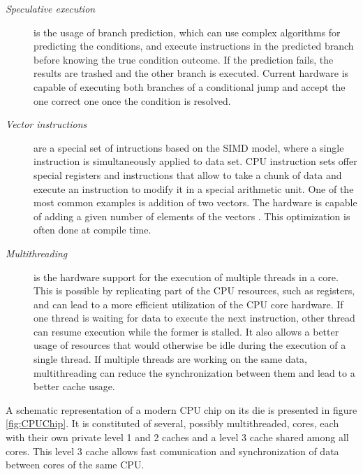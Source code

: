 \begin{description}
\begin{description}
	\end{description}
	\item[\textit{Speculative execution}] is the usage of branch prediction, which can use complex algorithms for predicting the conditions, and execute instructions in the predicted branch before knowing the true condition outcome. If the prediction fails, the results are trashed and the other branch is executed. Current hardware is capable of executing both branches of a conditional jump and accept the one correct one once the condition is resolved.
	\item[\textit{Vector instructions}] are a special set of intructions based on the SIMD model, where a single instruction is simultaneously applied to data set. CPU instruction sets offer special registers and instructions that allow to take a chunk of data and execute an instruction to modify it in a special arithmetic unit. One of the most common examples is addition of two vectors. The hardware is capable of adding a given number of elements of the vectors . This optimization is often done at compile time.
	\item[\textit{Multithreading}] is the hardware support for the execution of multiple threads in a core. This is possible by replicating part of the CPU resources, such as registers, and can lead to a more efficient utilization of the CPU core hardware. If one thread is waiting for data to execute the next instruction, other thread can resume execution while the former is stalled. It also allows a better usage of resources that would otherwise be idle during the execution of a single thread. If multiple threads are working on the same data, multithreading can reduce the synchronization between them and lead to a better cache usage.
\end{description}

A schematic representation of a modern CPU chip on its die is presented in figure \ref{fig:CPUChip}. It is constituted of several, possibly multithreaded, cores, each with their own private level 1 and 2 caches and a level 3 cache shared among all cores. This level 3 cache allows fast comunication and synchronization of data between cores of the same CPU.


